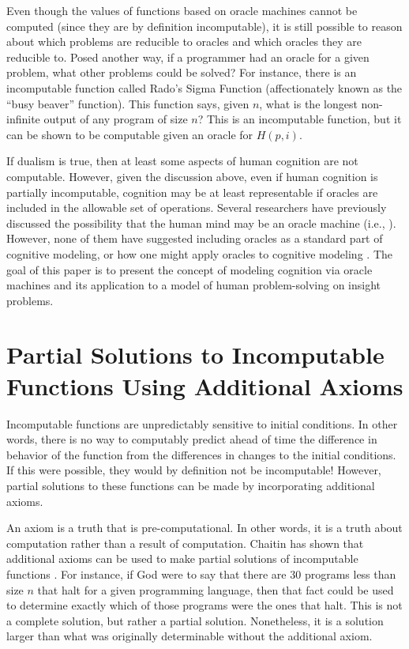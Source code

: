 Even though the values of functions based on oracle machines cannot be computed (since they are by definition incomputable), it is still possible to reason about which problems are reducible to oracles and which oracles they are reducible to.  Posed another way, if a programmer had an oracle for a given problem, what other problems could be solved?  For instance, there is an incomputable function called Rado's Sigma Function (affectionately known as the ``busy beaver'' function).  This function says, given $n$, what is the longest non-infinite output of any program of size $n$?  This is an incomputable function, but it can be shown to be computable given an oracle for $H(p, i)$.

If dualism is true, then at least some aspects of human cognition are not computable.  However, given the discussion above, even if human cognition is partially incomputable, cognition may be at least representable if oracles are included in the allowable set of operations.  Several researchers have previously discussed the possibility that the human mind may be an oracle machine (i.e., \citep{copeland1998}).  However, none of them have suggested including oracles as a standard part of cognitive modeling, or how one might apply oracles to cognitive modeling \citep{bartlett2010a, bartlett2010b}. The goal of this paper is to present the concept of modeling cognition via oracle machines and its application to a model of human problem-solving on insight problems.

\section[Partial Solutions to Incomputable Functions]{Partial Solutions to Incomputable Functions Using Additional Axioms}

Incomputable functions are unpredictably sensitive to initial conditions.  In other words, there is no way to computably predict ahead of time the difference in behavior of the function from the differences in changes to the initial conditions.  If this were possible, they would by definition not be incomputable!  However, partial solutions to these functions can be made by incorporating additional axioms.

An axiom is a truth that is pre-computational.  In other words, it is a truth about computation rather than a result of computation.  Chaitin has shown that additional axioms can be used to make partial solutions of incomputable functions \citep{chaitin1982}.  For instance, if God were to say that there are 30 programs less than size $n$ that halt for a given programming language, then that fact could be used to determine exactly which of those programs were the ones that halt.  This is not a complete solution, but rather a partial solution.  Nonetheless, it is a solution larger than what was originally determinable without the additional axiom.


